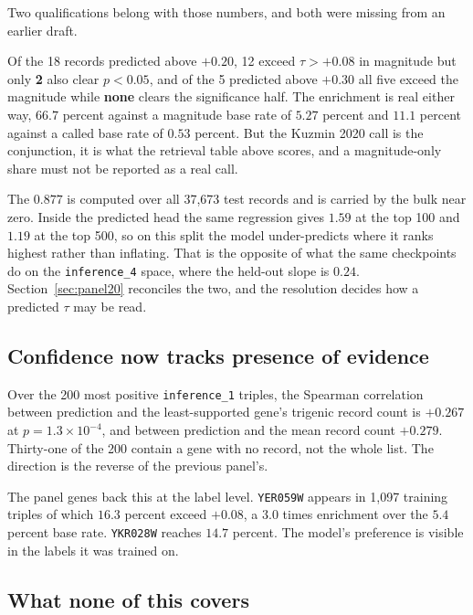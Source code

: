 Two qualifications belong with those numbers, and both were missing from an
earlier draft.

 Of the 18 records predicted above $+0.20$, 12
exceed $\tau > +0.08$ in magnitude but only \textbf{2} also clear $p < 0.05$, and
of the 5 predicted above $+0.30$ all five exceed the magnitude while
\textbf{none} clears the significance half. The enrichment is real either way,
$66.7$ percent against a magnitude base rate of $5.27$ percent and $11.1$ percent
against a called base rate of $0.53$ percent. But the Kuzmin 2020 call is the
conjunction, it is what the retrieval table above scores, and a magnitude-only
share must not be reported as a real call.

 The $0.877$ is computed
over all 37{,}673 test records and is carried by the bulk near zero. Inside the
predicted head the same regression gives $1.59$ at the top 100 and $1.19$ at the
top 500, so on this split the model under-predicts where it ranks highest rather
than inflating. That is the opposite of what the same checkpoints do on the
\texttt{inference\_4} space, where the held-out slope is $0.24$.
Section~\ref{sec:panel20} reconciles the two, and the resolution decides how a
predicted $\tau$ may be read.

\subsection{Confidence now tracks presence of evidence}

Over the 200 most positive \texttt{inference\_1} triples, the Spearman
correlation between prediction and the least-supported gene's trigenic record
count is $+0.267$ at $p = 1.3\times10^{-4}$, and between prediction and the mean
record count $+0.279$. Thirty-one of the 200 contain a gene with no record, not
the whole list. The direction is the reverse of the previous panel's.

The panel genes back this at the label level. \texttt{YER059W} appears in 1{,}097
training triples of which $16.3$ percent exceed $+0.08$, a $3.0$ times
enrichment over the $5.4$ percent base rate. \texttt{YKR028W} reaches $14.7$
percent. The model's preference is visible in the labels it was trained on.

\subsection{What none of this covers}

